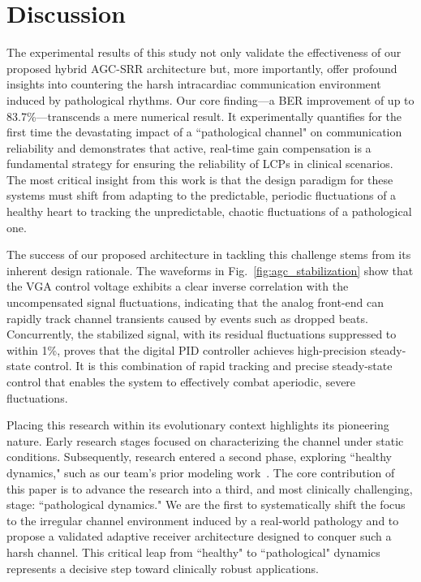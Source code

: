 \documentclass[journal]{IEEEtran}
\begin{document}
\section{Discussion}
\label{sec:discussion}
The experimental results of this study not only validate the effectiveness of our proposed hybrid AGC-SRR architecture but, more importantly, offer profound insights into countering the harsh intracardiac communication environment induced by pathological rhythms. Our core finding—a BER improvement of up to 83.7\%—transcends a mere numerical result. It experimentally quantifies for the first time the devastating impact of a ``pathological channel" on communication reliability and demonstrates that active, real-time gain compensation is a fundamental strategy for ensuring the reliability of LCPs in clinical scenarios. The most critical insight from this work is that the design paradigm for these systems must shift from adapting to the predictable, periodic fluctuations of a healthy heart to tracking the unpredictable, chaotic fluctuations of a pathological one.

The success of our proposed architecture in tackling this challenge stems from its inherent design rationale. The waveforms in Fig.~\ref{fig:agc_stabilization} show that the VGA control voltage exhibits a clear inverse correlation with the uncompensated signal fluctuations, indicating that the analog front-end can rapidly track channel transients caused by events such as dropped beats. Concurrently, the stabilized signal, with its residual fluctuations suppressed to within 1\%, proves that the digital PID controller achieves high-precision steady-state control. It is this combination of rapid tracking and precise steady-state control that enables the system to effectively combat aperiodic, severe fluctuations.

Placing this research within its evolutionary context highlights its pioneering nature. Early research stages focused on characterizing the channel under static conditions. Subsequently, research entered a second phase, exploring ``healthy dynamics," such as our team's prior modeling work~\cite{wei2024time}. The core contribution of this paper is to advance the research into a third, and most clinically challenging, stage: ``pathological dynamics." We are the first to systematically shift the focus to the irregular channel environment induced by a real-world pathology and to propose a validated adaptive receiver architecture designed to conquer such a harsh channel. This critical leap from ``healthy" to ``pathological" dynamics represents a decisive step toward clinically robust applications.
\end{document}
